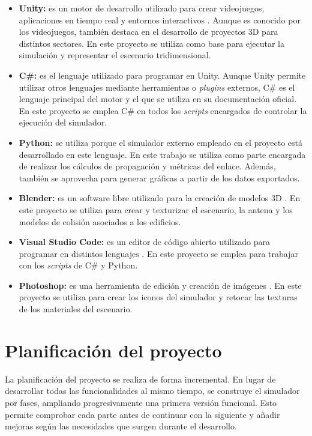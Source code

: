 \begin{itemize}
    \item \textbf{Unity:} es un motor de desarrollo utilizado para crear videojuegos, aplicaciones en tiempo real y entornos interactivos \cite{unity}. Aunque es conocido por los videojuegos, también destaca en el desarrollo de proyectos 3D para distintos sectores. En este proyecto se utiliza como base para ejecutar la simulación y representar el escenario tridimensional.

    \item \textbf{C\#:} es el lenguaje utilizado para programar en Unity. Aunque Unity permite utilizar otros lenguajes mediante herramientas o \textit{plugins} externos, C\# es el lenguaje principal del motor y el que se utiliza en su documentación oficial. En este proyecto se emplea C\# en todos los \textit{scripts} encargados de controlar la ejecución del simulador.

    \item \textbf{Python:} se utiliza porque el simulador externo empleado en el proyecto está desarrollado en este lenguaje. En este trabajo se utiliza como parte encargada de realizar los cálculos de propagación y métricas del enlace. Además, también se aprovecha para generar gráficas a partir de los datos exportados.

    \item \textbf{Blender:} es un software libre utilizado para la creación de modelos 3D \cite{blender}. En este proyecto se utiliza para crear y texturizar el escenario, la antena y los modelos de colisión asociados a los edificios.

    \item \textbf{Visual Studio Code:} es un editor de código abierto utilizado para programar en distintos lenguajes \cite{vscode}. En este proyecto se emplea para trabajar con los \textit{scripts} de C\# y Python.

    \item \textbf{Photoshop:} es una herramienta de edición y creación de imágenes \cite{photoshop}. En este proyecto se utiliza para crear los iconos del simulador y retocar las texturas de los materiales del escenario.
\end{itemize}


\section{Planificación del proyecto}

La planificación del proyecto se realiza de forma incremental. En lugar de desarrollar todas las funcionalidades al mismo tiempo, se construye el simulador por fases, ampliando progresivamente una primera versión funcional. Esto permite comprobar cada parte antes de continuar con la siguiente y añadir mejoras según las necesidades que surgen durante el desarrollo.

